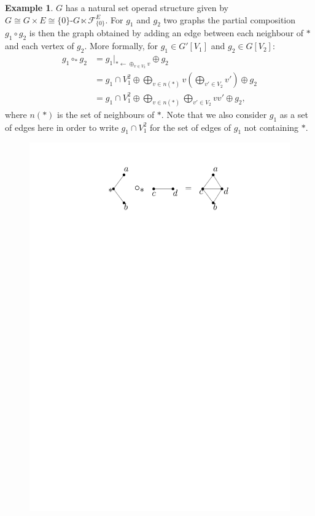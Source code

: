 \documentclass[a4paper]{article}
\theoremstyle{definition}
\newtheorem{example}[definition]{Example}
\begin{document}
\begin{example}
$G$ has a natural set operad structure given by 
$G\cong G\times E\cong \{0\}\text{-}G\ltimes\mathcal{F}_{\{0\}}^{E}$. 
For $g_1$ and $g_2$ two graphs the partial composition $g_1\circ g_2$ 
is then the graph obtained by adding an edge between each neighbour of 
$\ast$ and each vertex of $g_2$. More formally, for $g_1\in G'[V_1]$ and $g_2\in G[V_2]$:
\begin{equation}\begin{split}
	g_1\circ_{\ast} g_2 &= g_1|_{\ast \leftarrow \oplus_{v\in V_2} v}\oplus g_2\\
	&= g_1\cap V_1^2\oplus\bigoplus_{v\in n(\ast)}v(\bigoplus_{v'\in V_2} v')\oplus g_2 \\
	&= g_1\cap V_1^2\oplus\bigoplus_{v\in n(\ast)}\bigoplus_{v'\in V_2}vv'\oplus g_2,
\end{split}\end{equation}
where $n(\ast)$ is the set of neighbours of $\ast$. Note that we also 
consider $g_1$ as a set of edges here in order to write $g_1\cap V_1^2$ 
for the set of edges of $g_1$ not containing $\ast$.
\begin{figure}[htbp]
\begin{center}
\includegraphics[scale=0.5]{fig/gcomp2}
\end{center}
\end{figure}
\end{example}
\end{document}
